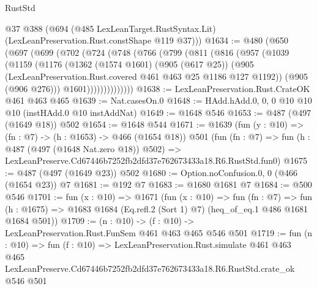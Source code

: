 \begin{lexlean}{RustStd}
\begin{coremodule}
      @37
      @388
      (@694 (@485 LexLeanTarget.RustSyntax.Lit) (LexLeanPreservation.Rust.constShape @119 @37)))
@1634 := @480
    (@650
      (@697
        (@699
          (@702
            (@724
              (@748
                (@766
                  (@799
                    (@811
                      (@816
                        (@957
                          (@1039
                            (@1159
                              (@1176
                                (@1362
                                  (@1574 @1601)
                                  (@905 (@617 @25))
                                  (@905
                                    (LexLeanPreservation.Rust.covered
                                      @461
                                      @463
                                      @25
                                      @1186
                                      @127
                                      @1192))
                                  (@905 (@906 @276)))
                                @1601))))))))))))))
@1638 := LexLeanPreservation.Rust.CrateOK @461 @463 @465
@1639 := Nat.casesOn.{0}
@1648 := HAdd.hAdd.{0, 0, 0} @10 @10 @10 (instHAdd.{0} @10 instAddNat)
@1649 := @1648 @546
@1653 := @487 (@497 (@1649 @18)) @502
@1654 := @1648 @544
@1671 := @1639
    (fun (y : @10) => (fn : @7) -> (h : @1653) -> @466 (@1654 @18))
    @501
    (fun (fn : @7) =>
    fun (h : @487 (@497 (@1648 Nat.zero @18)) @502) =>
    LexLeanPreserve.Cd67446b7252fb2dfd37e762673433a18.R6.RustStd.fun0)
@1675 := @487 (@497 (@1649 @23)) @502
@1680 := Option.noConfusion.{0, 0} (@466 (@1654 @23)) @7
@1681 := @192 @7
@1683 := @1680 @1681 @7
@1684 := @500 @546
@1701 := fun (x : @10) =>
  @1671
    (fun (x : @10) =>
    fun (fn : @7) =>
    fun (h : @1675) => @1683 @1684 (Eq.refl.{2} (Sort 1) @7) (heq_of_eq.{1} @486 @1681 @1684 @501))
@1709 := (n : @10) -> (f : @10) -> LexLeanPreservation.Rust.FunSem @461 @463 @465 @546 @501
@1719 := fun (n : @10) =>
  fun (f : @10) =>
  LexLeanPreservation.Rust.simulate
    @461
    @463
    @465
    LexLeanPreserve.Cd67446b7252fb2dfd37e762673433a18.R6.RustStd.crate_ok
    @546
    @501
\end{coremodule}
\end{lexlean}
